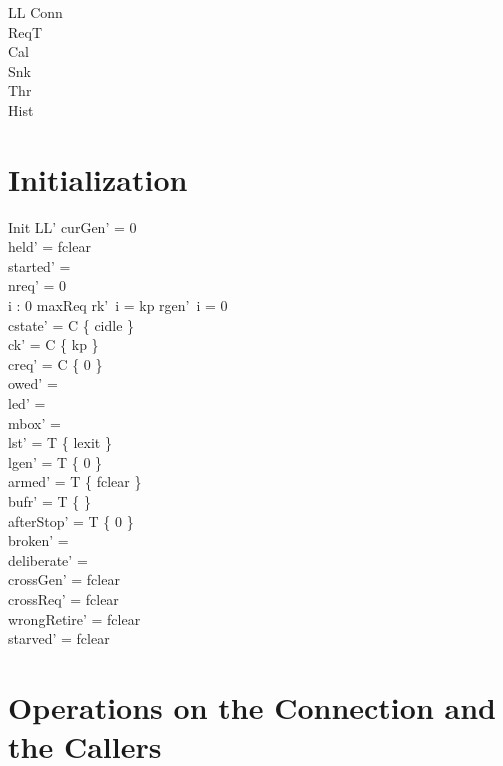 \documentclass[a4paper,10pt,fleqn]{article}
\begin{document}
\begin{schema}{LL}
  Conn \\
  ReqT \\
  Cal \\
  Snk \\
  Thr \\
  Hist
\end{schema}

\section{Initialization}

\begin{schema}{Init}
  LL'
\where
  curGen' = 0 \\
  held' = fclear \\
  started' = \emptyset \\
  nreq' = 0 \\
  \forall i : 0 \upto maxReq \spot rk'~i = kp \land rgen'~i = 0 \\
  cstate' = C \cross \{ cidle \} \\
  ck' = C \cross \{ kp \} \\
  creq' = C \cross \{ 0 \} \\
  owed' = \emptyset \\
  led' = \emptyset \\
  mbox' = \emptyset \\
  lst' = T \cross \{ lexit \} \\
  lgen' = T \cross \{ 0 \} \\
  armed' = T \cross \{ fclear \} \\
  bufr' = T \cross \{ \emptyset \} \\
  afterStop' = T \cross \{ 0 \} \\
  broken' = \emptyset \\
  deliberate' = \emptyset \\
  crossGen' = fclear \\
  crossReq' = fclear \\
  wrongRetire' = fclear \\
  starved' = fclear
\end{schema}

\section{Operations on the Connection and the Callers}
\end{document}
